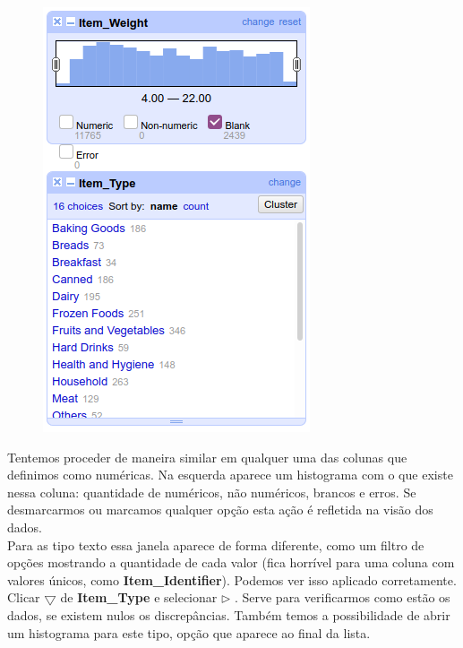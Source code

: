 \documentclass[a4paper,11pt]{article}
\begin{document}
\begin{minipage}{\textwidth}
	\vspace{5pt}
	\begin{figure}
		\vspace{-\baselineskip}
		\includegraphics[width=0.9\linewidth]{imagem/facets.png} 
	\end{figure}
	Tentemos proceder de maneira similar em qualquer uma das colunas que definimos como numéricas. Na esquerda aparece um histograma com o que existe nessa coluna: quantidade de numéricos, não numéricos, brancos e erros. Se desmarcarmos ou marcamos qualquer opção esta ação é refletida na visão dos dados. \\[3mm]
	Para as tipo texto essa janela aparece de forma diferente, como um filtro de opções mostrando a quantidade de cada valor (fica horrível para uma coluna com valores únicos, como \textbf{Item\_Identifier}). Podemos ver isso aplicado corretamente. Clicar $\bigtriangledown$ de \textbf{Item\_Type} e selecionar  $\triangleright$ . Serve para verificarmos como estão os dados, se existem nulos os discrepâncias. Também temos a possibilidade de abrir um histograma para este tipo, opção  que aparece ao final da lista.
\end{minipage}
\end{document}
